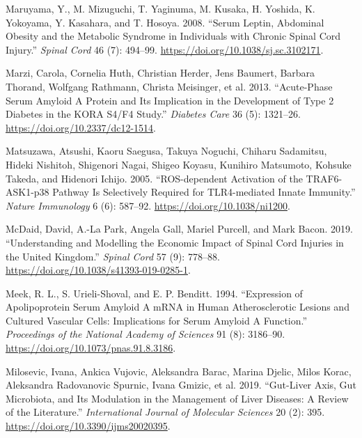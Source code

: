 \documentclass[9pt,lineno]{elife}
\newlength{\cslhangindent}
\newlength{\cslentryspacingunit} %
\newenvironment{CSLReferences}[2] %
 {%
  \setlength{\parindent}{0pt}
  \ifodd #1
  \let\oldpar\par
  \def\par{\hangindent=\cslhangindent\oldpar}
  \fi
  \setlength{\parskip}{#2\cslentryspacingunit}
 }%
 {}
\begin{document}
\begin{CSLReferences}{1}{0}
\leavevmode{}%
Maruyama, Y., M. Mizuguchi, T. Yaginuma, M. Kusaka, H. Yoshida, K. Yokoyama, Y. Kasahara, and T. Hosoya. 2008. {``Serum Leptin, Abdominal Obesity and the Metabolic Syndrome in Individuals with Chronic Spinal Cord Injury.''} \emph{Spinal Cord} 46 (7): 494--99. \url{https://doi.org/10.1038/sj.sc.3102171}.

\leavevmode{}%
Marzi, Carola, Cornelia Huth, Christian Herder, Jens Baumert, Barbara Thorand, Wolfgang Rathmann, Christa Meisinger, et al. 2013. {``Acute-{Phase Serum Amyloid A Protein} and {Its Implication} in the {Development} of {Type} 2 {Diabetes} in the {KORA S4}/{F4 Study}.''} \emph{Diabetes Care} 36 (5): 1321--26. \url{https://doi.org/10.2337/dc12-1514}.

\leavevmode{}%
Matsuzawa, Atsushi, Kaoru Saegusa, Takuya Noguchi, Chiharu Sadamitsu, Hideki Nishitoh, Shigenori Nagai, Shigeo Koyasu, Kunihiro Matsumoto, Kohsuke Takeda, and Hidenori Ichijo. 2005. {``{ROS-dependent} Activation of the {TRAF6-ASK1-p38} Pathway Is Selectively Required for {TLR4-mediated} Innate Immunity.''} \emph{Nature Immunology} 6 (6): 587--92. \url{https://doi.org/10.1038/ni1200}.

\leavevmode{}%
McDaid, David, A.-La Park, Angela Gall, Mariel Purcell, and Mark Bacon. 2019. {``Understanding and Modelling the Economic Impact of Spinal Cord Injuries in the {United Kingdom}.''} \emph{Spinal Cord} 57 (9): 778--88. \url{https://doi.org/10.1038/s41393-019-0285-1}.

\leavevmode{}%
Meek, R. L., S. Urieli-Shoval, and E. P. Benditt. 1994. {``Expression of Apolipoprotein Serum Amyloid {A mRNA} in Human Atherosclerotic Lesions and Cultured Vascular Cells: Implications for Serum Amyloid {A} Function.''} \emph{Proceedings of the National Academy of Sciences} 91 (8): 3186--90. \url{https://doi.org/10.1073/pnas.91.8.3186}.

\leavevmode{}%
Milosevic, Ivana, Ankica Vujovic, Aleksandra Barac, Marina Djelic, Milos Korac, Aleksandra Radovanovic Spurnic, Ivana Gmizic, et al. 2019. {``Gut-{Liver Axis}, {Gut Microbiota}, and {Its Modulation} in the {Management} of {Liver Diseases}: {A Review} of the {Literature}.''} \emph{International Journal of Molecular Sciences} 20 (2): 395. \url{https://doi.org/10.3390/ijms20020395}.


\end{CSLReferences}
\end{document}

